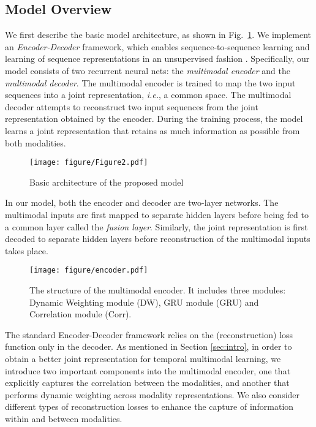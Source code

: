 \documentclass[10pt,twocolumn,letterpaper]{article}
\begin{document}
\subsection{Model Overview}
We first describe the basic model architecture, as shown in Fig.~\ref{fig:fig2}. We implement an \textit{Encoder-Decoder} framework, which enables sequence-to-sequence learning \cite{sutskever2014sequence} and learning of sequence representations in an unsupervised fashion \cite{srivastava2015unsupervised}. Specifically, our model consists of two recurrent neural nets: the \textit{multimodal encoder} and the \textit{multimodal decoder}. The multimodal encoder is trained to map the two input sequences into a joint representation, \textit{i.e.}, a common space. The multimodal decoder attempts to reconstruct two input sequences from the joint representation obtained by the encoder. During the training process, the model learns a joint representation that retains as much information as possible from both modalities.

\begin{figure}
\begin{center}
\texttt{[image: figure/Figure2.pdf]}
\end{center}
\caption{Basic architecture of the proposed model}
\label{fig:fig2}
\vspace{-1em}
\end{figure}

In our model, both the encoder and decoder are two-layer networks. The multimodal inputs are first mapped to separate hidden layers before being fed to a common layer called the \textit{fusion layer}. Similarly, the joint representation is first decoded to separate hidden layers before reconstruction of the multimodal inputs takes place.
 
\begin{figure*}
\begin{center}
\texttt{[image: figure/encoder.pdf]}
\end{center}
\caption{The structure of the multimodal encoder. It includes three modules: Dynamic Weighting module (DW), GRU module (GRU) and Correlation module (Corr).}
\label{fig:encoder}
\vspace{-1em}
\end{figure*}

The standard Encoder-Decoder framework relies on the (reconstruction) loss function only in the decoder. As mentioned in Section \ref{sec:intro}, in order to obtain a better joint representation for temporal multimodal learning, we introduce two important components into the multimodal encoder, one that explicitly captures the correlation between the modalities, and another that performs dynamic weighting across modality representations. We also consider different types of reconstruction losses to enhance the capture of information within and between modalities.
\end{document}
